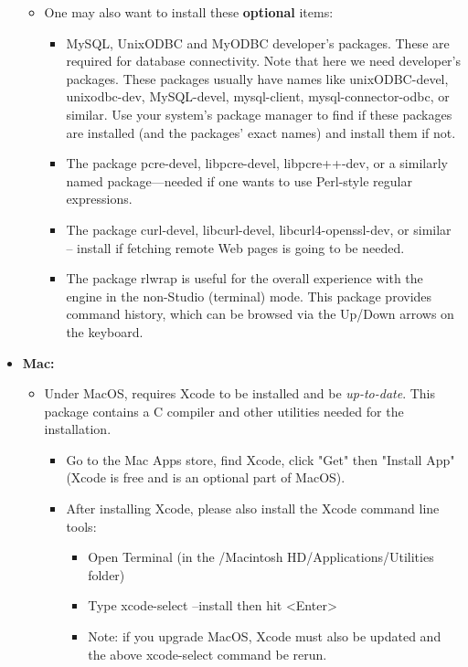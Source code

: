 \documentclass[11pt]{article}
\newcommand{\ERGOAI}{\mbox{\smaller{\ensuremath{\cal{E}}\smaller{{\sc{RGO}}}\ensuremath{\cal{AI}}}}\xspace}
\begin{document}
\begin{itemize}
\begin{itemize}
  \item  One may also want to install these \textbf{optional} items:
    \begin{itemize}
    \item MySQL, UnixODBC and MyODBC developer's packages. These are required
      for database connectivity. Note that here we need developer's
      packages. These packages usually have names like unixODBC-devel,
      unixodbc-dev, MySQL-devel, mysql-client, mysql-connector-odbc, or
      similar.  Use your system's package manager to find if these packages are
      installed (and the packages' exact names) and install them if not.
    \item The package pcre-devel, libpcre-devel, libpcre++-dev, or a similarly
      named package---needed if one wants to use Perl-style regular
      expressions.
    \item The package curl-devel, libcurl-devel, libcurl4-openssl-dev, or
      similar -- install if fetching remote Web pages is going to be needed.
    \item The package rlwrap is useful for the overall experience with the
      \ERGOAI engine in the non-Studio (terminal) mode. This package provides
      command history, which can be browsed via the Up/Down arrows on the
      keyboard.
    \end{itemize}
  \end{itemize}
\item[] \textbf{Mac:}
  \begin{itemize}
  \item Under MacOS, \ERGOAI requires Xcode to be installed and be
    \emph{up-to-date}.  This package contains a C compiler and other
    utilities needed for the \ERGOAI installation.
    \begin{itemize}
    \item Go to the Mac Apps store, find Xcode, click "Get" then "Install
      App" (Xcode is free and is an optional part of MacOS).
    \item After installing Xcode, please also install the Xcode command
      line tools:
      \begin{itemize}
      \item Open Terminal (in the /Macintosh HD/Applications/Utilities
        folder)
      \item Type xcode-select --install then hit <Enter>
      \item Note: if you upgrade MacOS, Xcode must also be updated and the
        above xcode-select command be rerun.

\end{itemize}
\end{itemize}
\end{itemize}
\end{itemize}
\end{document}
